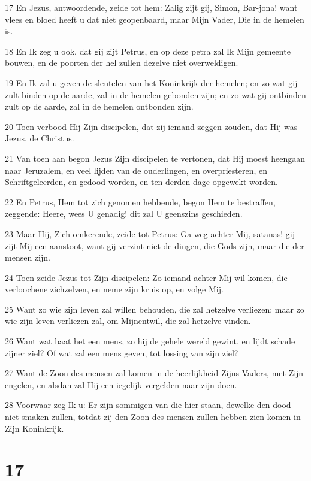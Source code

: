 \par 17 En Jezus, antwoordende, zeide tot hem: Zalig zijt gij, Simon, Bar-jona! want vlees en bloed heeft u dat niet geopenbaard, maar Mijn Vader, Die in de hemelen is.
\par 18 En Ik zeg u ook, dat gij zijt Petrus, en op deze petra zal Ik Mijn gemeente bouwen, en de poorten der hel zullen dezelve niet overweldigen.
\par 19 En Ik zal u geven de sleutelen van het Koninkrijk der hemelen; en zo wat gij zult binden op de aarde, zal in de hemelen gebonden zijn; en zo wat gij ontbinden zult op de aarde, zal in de hemelen ontbonden zijn.
\par 20 Toen verbood Hij Zijn discipelen, dat zij iemand zeggen zouden, dat Hij was Jezus, de Christus.
\par 21 Van toen aan begon Jezus Zijn discipelen te vertonen, dat Hij moest heengaan naar Jeruzalem, en veel lijden van de ouderlingen, en overpriesteren, en Schriftgeleerden, en gedood worden, en ten derden dage opgewekt worden.
\par 22 En Petrus, Hem tot zich genomen hebbende, begon Hem te bestraffen, zeggende: Heere, wees U genadig! dit zal U geenszins geschieden.
\par 23 Maar Hij, Zich omkerende, zeide tot Petrus: Ga weg achter Mij, satanas! gij zijt Mij een aanstoot, want gij verzint niet de dingen, die Gods zijn, maar die der mensen zijn.
\par 24 Toen zeide Jezus tot Zijn discipelen: Zo iemand achter Mij wil komen, die verloochene zichzelven, en neme zijn kruis op, en volge Mij.
\par 25 Want zo wie zijn leven zal willen behouden, die zal hetzelve verliezen; maar zo wie zijn leven verliezen zal, om Mijnentwil, die zal hetzelve vinden.
\par 26 Want wat baat het een mens, zo hij de gehele wereld gewint, en lijdt schade zijner ziel? Of wat zal een mens geven, tot lossing van zijn ziel?
\par 27 Want de Zoon des mensen zal komen in de heerlijkheid Zijns Vaders, met Zijn engelen, en alsdan zal Hij een iegelijk vergelden naar zijn doen.
\par 28 Voorwaar zeg Ik u: Er zijn sommigen van die hier staan, dewelke den dood niet smaken zullen, totdat zij den Zoon des mensen zullen hebben zien komen in Zijn Koninkrijk.

\chapter{17}

